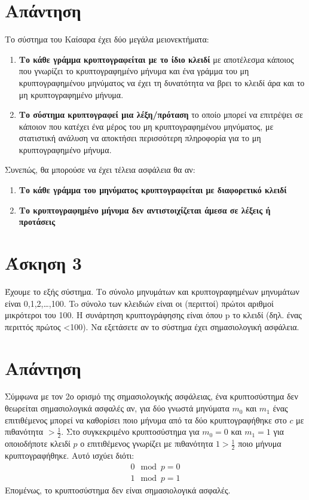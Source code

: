 \documentclass[12pt]{article}
\begin{document}
\section*{Απάντηση}
Το σύστημα του Καίσαρα έχει δύο μεγάλα μειονεκτήματα:
\begin{enumerate}
    \item \textbf{Το κάθε γράμμα κρυπτογραφείται με το ίδιο κλειδί} με αποτέλεσμα κάποιος που γνωρίζει το κρυπτογραφημένο μήνυμα και ένα γράμμα του μη κρυπτογραφημένου μηνύματος να έχει τη δυνατότητα να βρει το κλειδί άρα και το μη κρυπτογραφημένο μήνυμα.
    \item \textbf{Το σύστημα κρυπτογραφεί μια λέξη/πρόταση} το οποίο μπορεί να επιτρέψει σε κάποιον που κατέχει ένα μέρος του μη κρυπτογραφημένου μηνύματος, με στατιστική ανάλυση να αποκτήσει περισσότερη πληροφορία για το μη κρυπτογραφημένο μήνυμα.   
\end{enumerate}
Συνεπώς, θα μπορούσε να έχει τέλεια ασφάλεια θα αν:
\begin{enumerate}
    \item \textbf{Το κάθε γράμμα του μηνύματος κρυπτογραφείται με διαφορετικό κλειδί} 
    \item \textbf{Το κρυπτογραφημένο μήνυμα δεν αντιστοιχίζεται άμεσα σε λέξεις ή προτάσεις}
\end{enumerate}
\hfill \blacksquare
\section*{Άσκηση 3}
Έχουμε το εξής σύστημα. Το σύνολο μηνυμάτων και κρυπτογραφημένων
μηνυμάτων είναι {0,1,2,…,100}. To σύνολο των κλειδιών είναι οι (περιττοί) πρώτοι
αριθμοί μικρότεροι του 100. Η συνάρτηση κρυπτογράφησης είναι
όπου p το κλειδί (δηλ. ένας περιττός πρώτος <100).
Να εξετάσετε αν το σύστημα έχει σημασιολογική ασφάλεια.
\section*{Απάντηση}
Σύμφωνα με τον 2ο ορισμό της σημασιολογικής ασφάλειας, ένα κρυπτοσύστημα δεν θεωρείται σημασιολογικά ασφαλές αν, για δύο γνωστά μηνύματα \( m_0 \) και \( m_1\) ένας επιτιθέμενος μπορεί να καθορίσει ποιο μήνυμα από τα δύο κρυπτογραφήθηκε στο \( c \) με πιθανότητα \(>\frac{1}{2}\). 
\newline
\newline
Στο συγκεκριμένο κρυπτοσύστημα για \(m_0 = 0\) και \(m_1 = 1\) για οποιοδήποτε κλειδί \( p \) ο επιτιθέμενος γνωρίζει με πιθανότητα \(1> \frac{1}{2}\) ποιο μήνυμα κρυπτογραφήθηκε. Αυτό ισχύει διότι:
\begin{equation*}
\begin{array}{c}
   0 \mod p = 0\\
   1 \mod p = 1
\end{array}
\end{equation*}
Επομένως, το κρυπτοσύστημα δεν είναι σημασιολογικά ασφαλές.
\hfill \blacksquare
\end{document}
